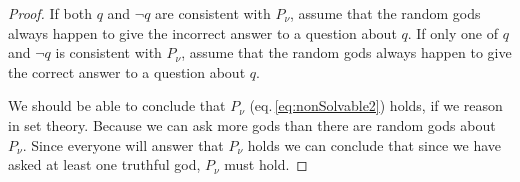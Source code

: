 \documentclass[twoside,twocolumn,a4paper,11pt]{article}
\theoremstyle{definition}
\begin{document}
\begin{proof}
If both $q$ and $\neg q$ are consistent with $P_\nu$,
assume that the random gods always happen to give the incorrect answer
to a question about $q$.
If only one of $q$ and $\neg q$ is consistent with $P_\nu$,
assume that the random gods always happen to give the correct answer 
to a question about $q$.


%
%
%
%
%


We should be able to conclude that $P_\nu$ (eq.\,\eqref{eq:nonSolvable2}) holds,
if we reason in 
set theory.
Because we can ask more gods than there are random gods about 
$P_\nu$.
Since everyone will answer that 
$P_\nu$ holds we can conclude that since 
we have asked at least one truthful god, $P_\nu$ must hold.


\end{proof}
\end{document}
